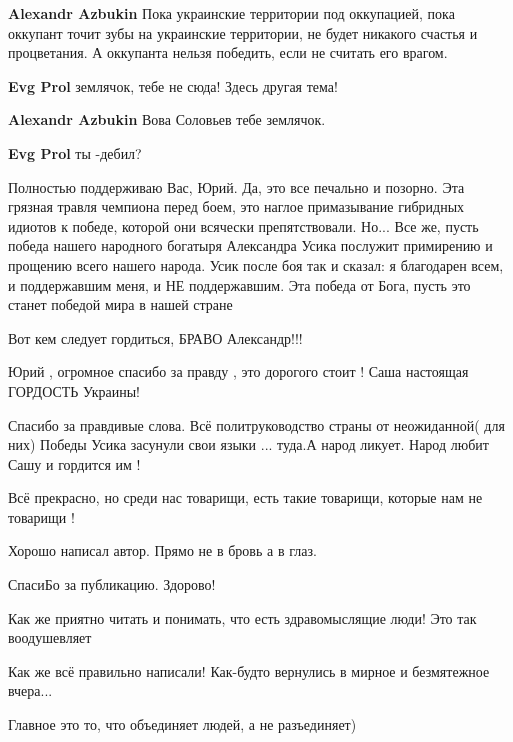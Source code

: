 \begin{itemize}
\begin{itemize} %
\textbf{Alexandr Azbukin} Пока украинские территории под оккупацией, пока оккупант точит зубы на украинские территории, не будет никакого счастья и процветания. А оккупанта нельзя победить, если не считать его врагом.

\textbf{Evg Prol} землячок, тебе не сюда! Здесь другая тема!

\textbf{Alexandr Azbukin} Вова Соловьев тебе землячок.

\textbf{Evg Prol} ты -дебил?
\end{itemize} %


Полностью поддерживаю Вас, Юрий. Да, это все печально и позорно. Эта грязная
травля чемпиона перед боем, это наглое примазывание гибридных идиотов к победе,
которой они всячески препятствовали. Но... Все же, пусть победа нашего
народного богатыря Александра Усика послужит примирению и прощению всего нашего
народа. Усик после боя так и сказал: я благодарен всем, и поддержавшим меня, и
НЕ поддержавшим. Эта победа от Бога, пусть это станет победой мира в нашей
стране


Вот кем следует гордиться, БРАВО Александр!!!

Юрий , огромное спасибо за правду , это дорогого стоит ! Саша настоящая ГОРДОСТЬ Украины!


Спасибо за правдивые слова. Всё политруководство страны от неожиданной( для
них) Победы Усика засунули свои языки ... туда.А народ ликует. Народ любит Сашу
и гордится им !

Всё прекрасно, но среди нас товарищи, есть такие товарищи, которые нам не товарищи !

Хорошо написал автор. Прямо не в бровь а в глаз.

СпасиБо за публикацию. Здорово!

Как же приятно читать и понимать, что есть здравомыслящие люди!
Это так воодушевляет

Как же всё правильно написали! Как-будто вернулись в мирное и безмятежное вчера...

Главное это то, что объединяет людей, а не разъединяет)


\end{itemize}
